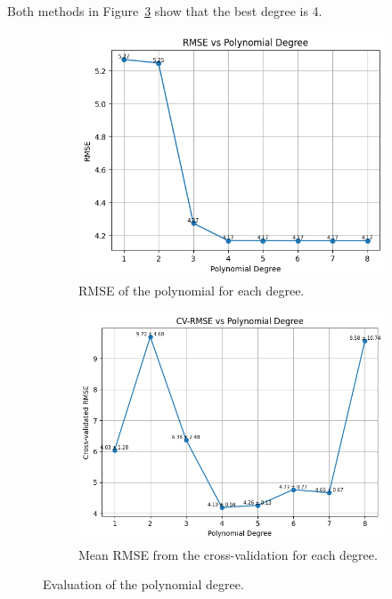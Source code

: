 \documentclass[a4paper]{article}
\begin{document}
Both methods in Figure~\ref{fig:degrees} show that the best degree is 4.

\begin{figure}[htbp]
  \centering
  \begin{subfigure}[b]{0.48\textwidth}
    \centering
    \includegraphics[width=\textwidth]{images/degrees_rmse.png}
    \caption{
      RMSE of the polynomial for each degree.
    }\label{fig:rmse}
  \end{subfigure}
  \hfill
  \begin{subfigure}[b]{0.48\textwidth}
    \centering
    \includegraphics[width=\textwidth]{images/cv_degrees_rmse.png}
    \caption{
      Mean RMSE from the cross-validation for each degree.
    }\label{fig:cv-rmse}
  \end{subfigure}
  \caption{
    Evaluation of the polynomial degree.
  }\label{fig:degrees}
\end{figure}
\end{document}
